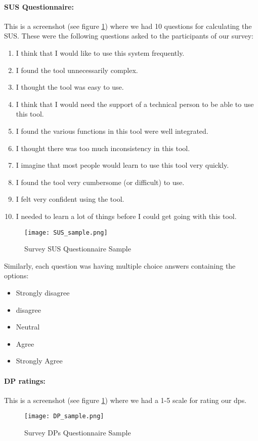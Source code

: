 \paragraph{SUS Questionnaire:} This is a screenshot (see figure \ref{appendix:fig:sus_sample}) where we had 10 questions for calculating the SUS. 
These were the following questions asked to the participants of our survey:
\begin{enumerate}
    \item I think that I would like to use this system frequently.
    \item I found the tool unnecessarily complex.
    \item I thought the tool was easy to use.
    \item I think that I would need the support of a technical person to be able to use this tool.
    \item I found the various functions in this tool were well integrated.
    \item I thought there was too much inconsistency in this tool.
    \item I imagine that most people would learn to use this tool very quickly.
    \item I found the tool very cumbersome (or difficult) to use.
    \item I felt very confident using the tool.
    \item I needed to learn a lot of things before I could get going with this tool.
\end{enumerate}
\begin{figure}[ht]
    \centering
    \texttt{[image: SUS\_sample.png]}
    \caption[SUS Questionnaire]{Survey SUS Questionnaire Sample}
    \label{appendix:fig:sus_sample}
\end{figure}
Similarly, each question was having multiple choice answers containing the options:
\begin{itemize}
    \item Strongly disagree
    \item disagree
    \item Neutral
    \item Agree
    \item Strongly Agree
\end{itemize}

\paragraph{DP ratings:} This is a screenshot (see figure \ref{appendix:fig:sus_sample}) where we had a 1-5 scale for rating our \ac{dp}s. 
\begin{figure}[ht]
    \centering
    \texttt{[image: DP\_sample.png]}
    \caption[DPs Questionnaire]{Survey DPs Questionnaire Sample}
    \label{appendix:fig:dps_sample}
\end{figure}

